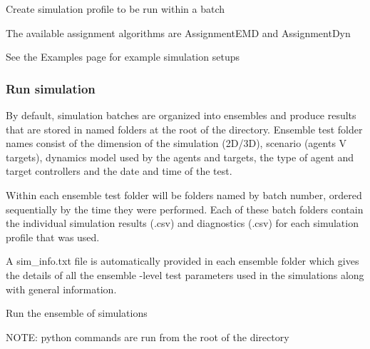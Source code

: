 Create simulation profile to be run within a batch

The available assignment algorithms are \textquotesingle{}Assignment\+E\+MD\textquotesingle{} and \textquotesingle{}Assignment\+Dyn\textquotesingle{}


\begin{DoxyCode}{0}
\end{DoxyCode}


See the Examples page for example simulation setups

\subsubsection*{Run simulation}

By default, simulation batches are organized into ensembles and produce results that are stored in named folders at the root of the directory. Ensemble test folder names consist of the dimension of the simulation (2D/3D), scenario (agents V targets), dynamics model used by the agents and targets, the type of agent and target controllers and the date and time of the test.

Within each ensemble test folder will be folders named by batch number, ordered sequentially by the time they were performed. Each of these batch folders contain the individual simulation results (.csv) and diagnostics (.csv) for each simulation profile that was used.

A sim\+\_\+info.\+txt file is automatically provided in each ensemble folder which gives the details of all the ensemble -\/level test parameters used in the simulations along with general information.

Run the ensemble of simulations 
\begin{DoxyCode}{0}
\end{DoxyCode}


N\+O\+TE\+: python commands are run from the root of the directory

